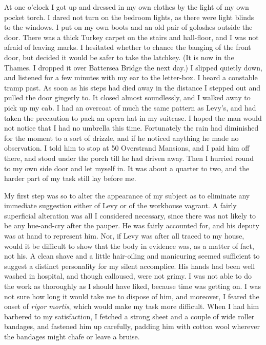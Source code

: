 At one o'clock I got up and dressed in my own clothes by the light of my own pocket torch. I dared not turn on the bedroom lights, as there were light blinds to the windows. I put on my own boots and an old pair of goloshes outside the door. There was a thick Turkey carpet on the stairs and hall-floor, and I was not afraid of leaving marks. I hesitated whether to chance the banging of the front door, but decided it would be safer to take the latchkey. (It is now in the Thames. I dropped it over Battersea Bridge the next day.) I slipped quietly down, and listened for a few minutes with my ear to the letter-box. I heard a constable tramp past. As soon as his steps had died away in the distance I stepped out and pulled the door gingerly to. It closed almost soundlessly, and I walked away to pick up my cab. I had an overcoat of much the same pattern as Levy's, and had taken the precaution to pack an opera hat in my suitcase. I hoped the man would not notice that I had no umbrella this time. Fortunately the rain had diminished for the moment to a sort of drizzle, and if he noticed anything he made no observation. I told him to stop at 50 Overstrand Mansions, and I paid him off there, and stood under the porch till he had driven away. Then I hurried round to my own side door and let myself in. It was about a quarter to two, and the harder part of my task still lay before me.

My first step was so to alter the appearance of my subject as to eliminate any immediate suggestion either of Levy or of the workhouse vagrant. A fairly superficial alteration was all I considered necessary, since there was not likely to be any hue-and-cry after the pauper. He was fairly accounted for, and his deputy was at hand to represent him. Nor, if Levy was after all traced to my house, would it be difficult to show that the body in evidence was, as a matter of fact, not his. A clean shave and a little hair-oiling and manicuring seemed sufficient to suggest a distinct personality for my silent accomplice. His hands had been well washed in hospital, and though calloused, were not grimy. I was not able to do the work as thoroughly as I should have liked, because time was getting on. I was not sure how long it would take me to dispose of him, and moreover, I feared the onset of \textit{rigor mortis}, which would make my task more difficult. When I had him barbered to my satisfaction, I fetched a strong sheet and a couple of wide roller bandages, and fastened him up carefully, padding him with cotton wool wherever the bandages might chafe or leave a bruise.

